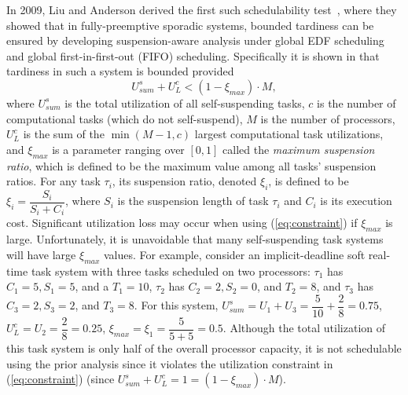 In 2009, Liu and Anderson derived the first such schedulability test~\cite{Liu3}, where they showed that in fully-preemptive sporadic systems, bounded tardiness can be ensured by developing suspension-aware analysis under global EDF scheduling and global first-in-first-out (FIFO) scheduling. Specifically it is shown in \cite{Liu3} that tardiness in such a system is bounded provided 
\begin{equation}\label{eq:constraint} U_{sum}^s + U_L^c < (1-\xi_{max}) \cdot M , \end{equation}
where $U_{sum}^s$ is the total utilization of all self-suspending tasks, $c$ is the number of computational tasks (which do not self-suspend), $M$ is the number of processors, $U_L^c$ is the sum of the $\min(M-1,c)$ largest computational task utilizations, and $\xi_{max}$ is a parameter ranging over $[0,1]$ called the \textit{maximum suspension ratio}, which is defined to be the maximum value among all tasks' suspension ratios. For any task $\tau_i$, its suspension ratio, denoted $\xi_i$, is defined to be $\xi_i = \dfrac{S_i}{S_i+C_i}$, where $S_i$ is the suspension length of task $\tau_i$ and $C_i$ is its execution cost.  Significant utilization loss may occur when using (\ref{eq:constraint}) if $\xi_{max}$ is large. Unfortunately, it is unavoidable that many self-suspending task systems will have large $\xi_{max}$ values. For example, consider an implicit-deadline soft real-time task system with three tasks scheduled on two processors: $\tau_1$ has $C_1=5, S_1=5$, and a $T_1=10$, $\tau_2$ has $C_2=2, S_2=0$, and $T_2=8$, and $\tau_3$ has $C_3=2, S_3=2$, and $T_3=8$. For this system, $U_{sum}^s = U_1+U_3= \dfrac{5}{10} + \dfrac{2}{8} = 0.75$, $U_L^c = U_2 = \dfrac{2}{8} = 0.25$, $\xi_{max} = \xi_1 = \dfrac{5}{5+5} = 0.5$. Although the total utilization of this task system is only half of the overall processor capacity, it is not schedulable using the prior analysis since it violates the utilization constraint in (\ref{eq:constraint}) (since $U_{sum}^s+U_L^c =1=(1-\xi_{max}) \cdot M$).


